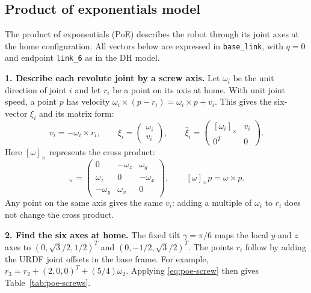 \subsection{Product of exponentials model}
\label{sec:poe}

The product of exponentials (PoE) describes the robot through its joint axes
at the home configuration. All vectors below are expressed in
\texttt{base\_link}, with $q=0$ and endpoint \texttt{link\_6} as in the DH model.

\textbf{1. Describe each revolute joint by a screw axis.}
Let $\omega_i$ be the unit direction of joint $i$ and let $r_i$ be a point on
its axis at home. With unit joint speed, a point $p$ has velocity
$\omega_i\times(p-r_i)=\omega_i\times p+v_i$. This gives the six-vector
$\xi_i$ and its matrix form:
\begin{equation}
 v_i=-\omega_i\times r_i,\qquad
 \xi_i=\begin{pmatrix}\omega_i\\v_i\end{pmatrix},\qquad
 \widehat\xi_i=\begin{pmatrix}[\omega_i]_\times&v_i\\0^T&0\end{pmatrix}.
 \label{eq:poe-screw}
\end{equation}
Here $[\omega]_\times$ represents the cross product:
\begin{equation}
 [\omega]_\times=
 \begin{pmatrix}
 0&-\omega_z&\omega_y\\
 \omega_z&0&-\omega_x\\
 -\omega_y&\omega_x&0
 \end{pmatrix},
 \qquad [\omega]_\times p=\omega\times p.
 \label{eq:poe-skew}
\end{equation}
Any point on the same axis gives the same $v_i$: adding a multiple of
$\omega_i$ to $r_i$ does not change the cross product.

\textbf{2. Find the six axes at home.}
The fixed tilt $\gamma=\pi/6$ maps the local $y$ and $z$ axes to
$(0,\sqrt{3}/2,1/2)^T$ and $(0,-1/2,\sqrt{3}/2)^T$.
The points $r_i$ follow by adding the URDF joint offsets in the base frame.
For example, $r_3=r_2+(2,0,0)^T+(5/4)\omega_2$.
Applying \eqref{eq:poe-screw} then gives Table~\ref{tab:poe-screws}.

